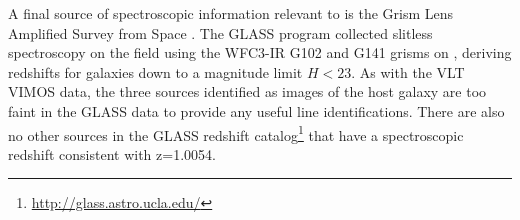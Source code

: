 A final source of spectroscopic information relevant to \spock is the
Grism Lens Amplified Survey from Space \citep[GLASS; PID:
  HST-GO-13459; PI:T. Treu;][]{Schmidt:2014,Treu:2015a}. The GLASS
program collected slitless spectroscopy on the  field using
the WFC3-IR G102 and G141 grisms on \HST, deriving redshifts for
galaxies down to a magnitude limit $H<23$.  As with the VLT VIMOS
data, the three sources identified as images of the \spock host galaxy
are too faint in the GLASS data to provide any useful line
identifications.  There are also no other sources in the GLASS
redshift catalog\footnote{\url{http://glass.astro.ucla.edu/}} that
have a spectroscopic redshift consistent with z=1.0054.

